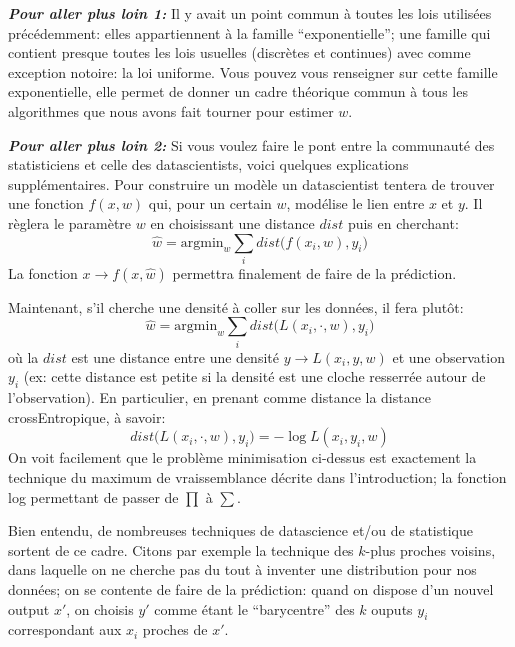 \documentclass[11pt]{article}
\begin{document}
    \textbf{\emph{Pour aller plus loin 1:}} Il y avait un point commun à
toutes les lois utilisées précédemment: elles appartiennent à la famille
``exponentielle''; une famille qui contient presque toutes les lois
usuelles (discrètes et continues) avec comme exception notoire: la loi
uniforme. Vous pouvez vous renseigner sur cette famille exponentielle,
elle permet de donner un cadre théorique commun à tous les algorithmes
que nous avons fait tourner pour estimer \(w\).

    \textbf{\emph{Pour aller plus loin 2:}} Si vous voulez faire le pont
entre la communauté des statisticiens et celle des datascientists, voici
quelques explications supplémentaires. Pour construire un modèle un
datascientist tentera de trouver une fonction \(f(x,w)\) qui, pour un
certain \(w\), modélise le lien entre \(x\) et \(y\). Il règlera le
paramètre \(w\) en choisissant une distance \(dist\) puis en cherchant:
\[
\hat w  = \mathrm{argmin}_w  \sum_i  dist \Big( f(x_i  ,w) , y_i \Big)  
\] La fonction \(x \to f(x,\hat w)\) permettra finalement de faire de la
prédiction.

Maintenant, s'il cherche une densité à coller sur les données, il fera
plutôt: \[
\hat w  = \mathrm{argmin}_w  \sum_i  dist \Big( L (x_i, \cdot  ,w) , y_i \Big)  
\] où la \(dist\) est une distance entre une densité
\(y \to L (x_i, y ,w)\) et une observation \(y_i\) (ex: cette distance
est petite si la densité est une cloche resserrée autour de
l'observation). En particulier, en prenant comme distance la distance
crossEntropique, à savoir: \[
 dist \Big( L (x_i, \cdot  ,w) , y_i \Big)    =  -\log L(x_i,y_i,w) 
\] On voit facilement que le problème minimisation ci-dessus est
exactement la technique du maximum de vraissemblance décrite dans
l'introduction; la fonction log permettant de passer de \(\prod\) à
\(\sum\).

Bien entendu, de nombreuses techniques de datascience et/ou de
statistique sortent de ce cadre. Citons par exemple la technique des
\(k\)-plus proches voisins, dans laquelle on ne cherche pas du tout à
inventer une distribution pour nos données; on se contente de faire de
la prédiction: quand on dispose d'un nouvel output \(x'\), on choisis
\(y'\) comme étant le ``barycentre'' des \(k\) ouputs \(y_i\)
correspondant aux \(x_i\) proches de \(x'\).


    
    
    
    
\end{document}
